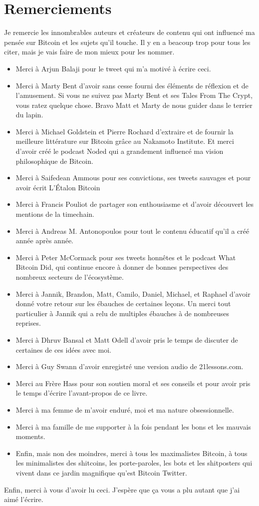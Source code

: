 \chapter*{Remerciements}

Je remercie les innombrables auteurs et créateurs de contenu qui ont
influencé ma pensée sur Bitcoin et les sujets qu'il touche. Il y en a beacoup
trop pour tous les citer, mais je vais faire de mon mieux pour les nommer.

\begin{itemize}
  \item Merci à Arjun Balaji pour le tweet qui m'a motivé à écrire ceci.
  \item Merci à Marty Bent d'avoir sans cesse fourni des éléments de réflexion
  et de l'amusement. Si vous ne suivez pas Marty Bent et ses Tales From The
  Crypt, vous ratez quelque chose. Bravo Matt et Marty de nous guider dans le
  terrier du lapin.
  \item Merci à Michael Goldstein et Pierre Rochard d'extraire et de fournir la
  meilleure littérature sur Bitcoin grâce au Nakamoto Institute. Et merci
  d'avoir créé le podcast Noded qui a grandement influencé ma vision
  philosophique de Bitcoin.
  \item Merci à Saifedean Ammous pour ses convictions, ses tweets sauvages et
  pour avoir écrit L'Étalon Bitcoin
  \item Merci à Francis Pouliot de partager son enthousiasme et d'avoir
  découvert les mentions de la timechain.
  \item Merci à Andreas M. Antonopoulos pour tout le contenu éducatif qu'il a
  créé année après année.
  \item Merci à Peter McCormack pour ses tweets honnêtes et le podcast What
  Bitcoin Did, qui continue encore à donner de bonnes perspectives des nombreux
  secteurs de l'écosystème.
  \item Merci à Jannik, Brandon, Matt, Camilo, Daniel, Michael, et Raphael
  d'avoir donné votre retour sur les ébauches de certaines leçons. Un merci tout
  particulier à Jannik qui a relu de multiples ébauches à de nombreuses
  reprises.
  \item Merci à Dhruv Bansal et Matt Odell d'avoir pris le temps de discuter de
  certaines de ces idées avec moi.
  \item Merci à Guy Swann d'avoir enregistré une version audio de 21lessons.com.
  \item Merci au Frère Hass pour son soutien moral et ses conseils et pour avoir
  pris le temps d'écrire l'avant-propos de ce livre.
  \item Merci à ma femme de m'avoir enduré, moi et ma nature obsessionnelle.
  \item Merci à ma famille de me supporter à la fois pendant les bons et les
  mauvais moments.
  \item Enfin, mais non des moindres, merci à tous les maximalistes Bitcoin, à
  tous les minimalistes des shitcoins, les porte-paroles, les bots et les
  shitposters qui vivent dans ce jardin magnifique qu'est Bitcoin Twitter.
\end{itemize}

Enfin, merci à vous d'avoir lu ceci. J'espère que ça vous a plu autant que j'ai
aimé l'écrire.
